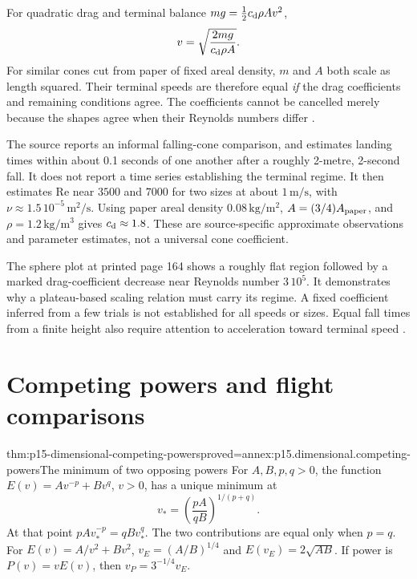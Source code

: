 For quadratic drag and terminal balance \(mg=\frac12c_{\rm d}\rho A v^2\),
\[
 v=\sqrt{\frac{2mg}{c_{\rm d}\rho A}}.
\]
For similar cones cut from paper of fixed areal density, \(m\) and \(A\)
both scale as length squared. Their terminal speeds are therefore equal
\emph{if} the drag coefficients and remaining conditions agree.
The coefficients cannot be cancelled merely because the shapes agree when
their Reynolds numbers differ \cite[4.3.1]{Mahajan2014Insight}.

The source reports an informal falling-cone comparison, and estimates
landing times within about 0.1 seconds of one another after a roughly
2-metre, 2-second fall. It does not report a time series establishing the
terminal regime. It then estimates
\(\mathrm{Re}\) near \(3500\) and \(7000\) for two sizes at about
\(1\,\mathrm{m/s}\), with \(\nu\approx1.5\,10^{-5}\,\mathrm{m^2/s}\).
Using paper areal density \(0.08\,\mathrm{kg/m^2}\),
\(A=(3/4)A_{\rm paper}\), and \(\rho=1.2\,\mathrm{kg/m^3}\) gives
\(c_{\rm d}\approx1.8\). These are source-specific approximate observations
and parameter estimates, not a universal cone coefficient.

The sphere plot at printed page 164 shows a roughly flat region followed
by a marked drag-coefficient decrease near Reynolds number \(3\,10^5\).
It demonstrates why a plateau-based scaling relation must carry its regime.
A fixed coefficient inferred from a few trials is not established for all
speeds or sizes. Equal fall times from a finite height also require attention
to acceleration toward terminal speed \cite[4.3.1, 5.3.2]{Mahajan2014Insight}.

\section{Competing powers and flight comparisons}
\label{sec:p15-dimensional-optimization}

\begin{hbtheorem}{thm:p15-dimensional-competing-powers}{proved=annex:p15.dimensional.competing-powers}{The minimum of two opposing powers}
For \(A,B,p,q>0\), the function
\(E(v)=Av^{-p}+Bv^q\), \(v>0\), has a unique minimum at
\[
 v_*=\left(\frac{pA}{qB}\right)^{1/(p+q)}.
\]
At that point \(pAv_*^{-p}=qBv_*^q\).
The two contributions are equal only when \(p=q\).
For \(E(v)=A/v^2+Bv^2\), \(v_E=(A/B)^{1/4}\) and
\(E(v_E)=2\sqrt{AB}\). If power is \(P(v)=vE(v)\), then
\(v_P=3^{-1/4}v_E\).
\end{hbtheorem}


